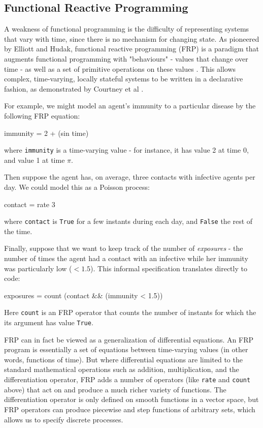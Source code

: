 \documentclass{sig-alternate}
\begin{document}
 \subsection{Functional Reactive Programming}
 
  A weakness of functional programming is the difficulty of representing systems that vary with time, since there is no mechanism for changing state.  As pioneered by Elliott and Hudak, functional reactive programming (FRP) is a paradigm that augments functional programming with "behaviours" - values that change over time - as well as a set of primitive operations on these values \cite{fran}. This allows complex, time-varying, locally stateful systems to be written in a declarative fashion, as demonstrated by Courtney et al \cite{yampa}. 
  
   For example, we might model an agent's immunity to a particular disease by the following FRP equation: 
 \begin{code}
 immunity = 2 + (sin time)
 \end{code}
 where \lstinline{immunity} is a time-varying value - for instance, it has value 2 at time 0, and value 1 at time $\pi$.
 
 Then suppose the agent has, on average, three contacts with infective agents per day. We could model this as a Poisson process: 
  \begin{code}
contact = rate 3
 \end{code}
 where \lstinline{contact} is \lstinline{True} for a few instants during each day, and \lstinline{False} the rest of the time.
 
Finally, suppose that we want to keep track of the number of \emph{exposures} - the number of times the agent had a contact with an infective while her immunity was particularly low ($<1.5$). This informal specification translates directly to code: 
\begin{code}
exposures = count (contact && (immunity < 1.5))
\end{code}
  Here \lstinline{count} is an FRP operator that counts the number of instants for which the its argument has value \lstinline{True}.

    FRP can in fact be viewed as a generalization of differential equations.  An FRP program is essentially a set of equations between time-varying values (in other words, functions of time). But where differential equations are limited to the standard mathematical operations such as addition, multiplication, and the differentiation operator, FRP adds a number of operators (like \lstinline{rate} and \lstinline{count} above) that act on and produce a much richer variety of functions. The differentiation operator is only defined on smooth functions in a vector space, but FRP operators can produce piecewise and step functions of arbitrary sets, which allows us to specify discrete processes. 
  
\end{document}
